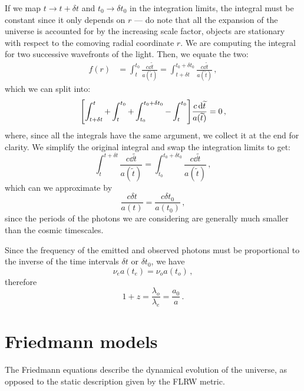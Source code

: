 \documentclass[main.tex]{subfiles}
\begin{document}
If we map \(t \rightarrow t + \delta t\) and \(t_0 \rightarrow \delta t_0 \) in the integration limits, the integral must be constant since it only depends on \(r\) --- do note that all the expansion of the universe is accounted for by the increasing scale factor, objects are stationary with respect to the comoving radial coordinate \(r\).
We are computing the integral for two successive wavefronts of the light.
Then, we equate the two: 
%
\begin{align}
f(r) &= \int_{t}^{t_0 } \frac{c \dd{\widetilde{t} }}{a(\widetilde{t})} = \int_{t+\delta t}^{t_0 + \delta t_0 } \frac{c \dd{\widetilde{t} }}{a(\widetilde{t})}
\,,
\end{align}
%
which we can split into: 
%
\begin{align}
\qty[\int_{t+ \delta t}^{t} + \int_{t}^{t_0} + \int_{t_0 }^{t_0 + \delta t_0 } - \int_{t}^{t_0 }] \frac{c \dd{\widetilde{t}}}{a(\widetilde{t})} = 0
\,,
\end{align}
%
where, since all the integrals have the same argument, we collect it at the end for clarity.
We simplify the original integral and swap the integration limits to get:
\begin{equation}
  \int_{t}^{t + \delta t} \frac{c\dd{\widetilde{t}}}{a(\widetilde{t})} = \int_{t_0 }^{t_0 + \delta t_0 } \frac{c\dd{\widetilde{t}}}{a(\widetilde{t})}\,,
\end{equation}
%
which can we approximate by
\begin{equation}
\frac{c \delta t}{a(t)} =   \frac{c \delta t_0 }{a(t_0 )}\,,
\end{equation}
%
since the periods of the photons we are considering are generally much smaller than the cosmic timescales.

Since the frequency of the emitted and observed photons must be proportional to the inverse of the time intervals \(\delta t\) or \(\delta t_0 \), we have
\begin{equation}
  \nu_{e} a(t_{e}) = \nu_{o} a(t_{o})\,,
\end{equation}
%
therefore 
%
\begin{equation}
  1 + z = \frac{\lambda_{o}}{\lambda_{e}}
  = \frac{a_0 }{a}\,.
\end{equation}

\chapter{Friedmann models}

The Friedmann equations describe the dynamical evolution of the universe, as opposed to the static description given by the FLRW metric.
\end{document}

